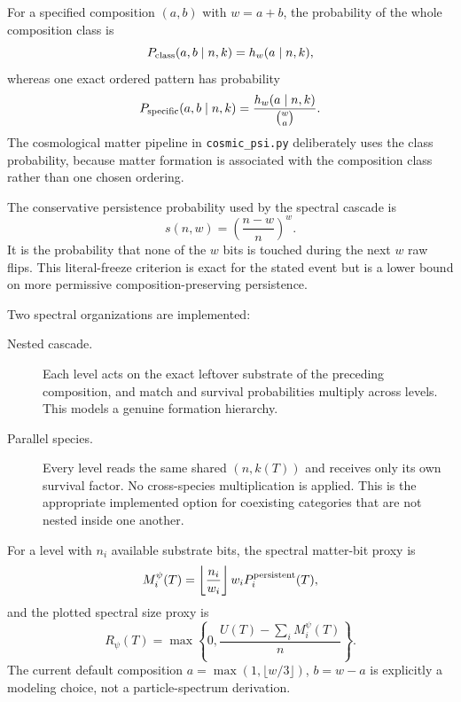 \documentclass[11pt]{article}
\begin{document}
For a specified composition $(a,b)$ with $w=a+b$, the probability of the
whole composition class is
\begin{equation}
 P_{\rm class}(a,b\mid n,k)=h_w(a\mid n,k),
 \label{eq:classprob}
\end{equation}
whereas one exact ordered pattern has probability
\begin{equation}
 P_{\rm specific}(a,b\mid n,k)
 =\frac{h_w(a\mid n,k)}{\binom wa}.
 \label{eq:specificprob}
\end{equation}
The cosmological matter pipeline in \texttt{cosmic\_psi.py} deliberately
uses the class probability, because matter formation is associated with the
composition class rather than one chosen ordering.

The conservative persistence probability used by the spectral cascade is
\begin{equation}
 s(n,w)=\left(\frac{n-w}{n}\right)^w.
 \label{eq:survival}
\end{equation}
It is the probability that none of the $w$ bits is touched during the next
$w$ raw flips.  This literal-freeze criterion is exact for the stated event
but is a lower bound on more permissive composition-preserving persistence.

Two spectral organizations are implemented:
\begin{description}
 \item[Nested cascade.]  Each level acts on the exact leftover substrate of
 the preceding composition, and match and survival probabilities multiply
 across levels.  This models a genuine formation hierarchy.
 \item[Parallel species.]  Every level reads the same shared $(n,k(T))$ and
 receives only its own survival factor.  No cross-species multiplication is
 applied.  This is the appropriate implemented option for coexisting
 categories that are not nested inside one another.
\end{description}

For a level with $n_i$ available substrate bits, the spectral matter-bit
proxy is
\begin{equation}
 M_i^{\psi}(T)
 =\left\lfloor\frac{n_i}{w_i}\right\rfloor w_i
   P_i^{\rm persistent}(T),
 \label{eq:psi-matter}
\end{equation}
and the plotted spectral size proxy is
\begin{equation}
 R_{\psi}(T)
 =\max\left\{0,\frac{U(T)-\sum_iM_i^{\psi}(T)}{n}\right\}.
 \label{eq:psi-size}
\end{equation}
The current default composition
$a=\max(1,\lfloor w/3\rfloor)$, $b=w-a$ is explicitly a modeling choice,
not a particle-spectrum derivation.
\end{document}
